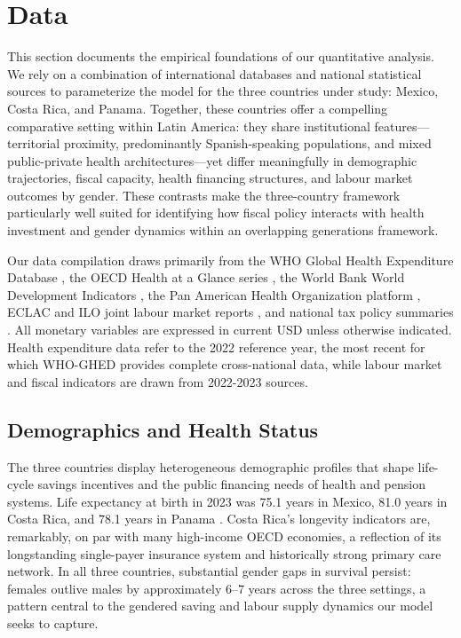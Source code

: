 \documentclass[12pt,a4paper]{article}
\begin{document}
\section{Data}\label{sec:data}

This section documents the empirical foundations of our quantitative
analysis. We rely on a combination of international databases and
national statistical sources to parameterize the model for the three
countries under study: Mexico, Costa Rica, and Panama. Together, these
countries offer a compelling comparative setting within Latin America:
they share institutional features---territorial proximity,
predominantly Spanish-speaking populations, and mixed public-private
health architectures---yet differ meaningfully in demographic
trajectories, fiscal capacity, health financing structures, and labour
market outcomes by gender. These contrasts make the three-country
framework particularly well suited for identifying how fiscal policy
interacts with health investment and gender dynamics within an
overlapping generations framework.

Our data compilation draws primarily from the WHO Global Health
Expenditure Database \citep{WHOGHED2024}, the OECD Health at a Glance
series \citep{OECDHaG2023}, the World Bank World Development
Indicators \citep{WorldBankWDI2024}, the Pan American Health
Organization platform \citep{PAHOHIA2024}, ECLAC and ILO joint labour
market reports \citep{ECLACILO2023}, and national tax policy summaries
\citep{PwCWWTS2024, OECDRevStats2024}. All monetary variables are
expressed in current USD unless otherwise indicated. Health expenditure
data refer to the 2022 reference year, the most recent for which
WHO-GHED provides complete cross-national data, while labour market
and fiscal indicators are drawn from 2022-2023 sources.

\subsection{Demographics and Health Status}\label{subsec:demog}

The three countries display heterogeneous demographic profiles that
shape life-cycle savings incentives and the public financing needs of
health and pension systems. Life expectancy at birth in 2023 was 75.1
years in Mexico, 81.0 years in Costa Rica, and 78.1 years in Panama
\citep{PAHOHIA2024, WHOGHO2024}. Costa Rica's longevity indicators are,
remarkably, on par with many high-income OECD economies, a reflection
of its longstanding single-payer insurance system and historically
strong primary care network. In all three countries, substantial gender
gaps in survival persist: females outlive males by approximately 6--7
years across the three settings, a pattern central to the gendered
saving and labour supply dynamics our model seeks to capture.
\end{document}
